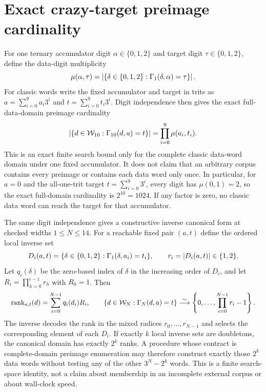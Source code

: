 \documentclass{article}
\newcommand{\fitmath}[1]{\resizebox{0.99\linewidth}{!}{$\displaystyle #1$}}
\begin{document}
\section{Exact crazy-target preimage cardinality}

For one ternary accumulator digit $\alpha\in\{0,1,2\}$ and target digit
$\tau\in\{0,1,2\}$, define the data-digit multiplicity
\[
  \mu(\alpha,\tau)
    = \left|\{\delta\in\{0,1,2\}:\Gamma_{1}\!\left(\delta,\alpha\right)=\tau\}\right|.
\]
For classic words write the fixed accumulator and target in trits as
$a=\sum_{i=0}^{9}a_i3^i$ and $t=\sum_{i=0}^{9}t_i3^i$. Digit independence
then gives the exact full-data-domain preimage cardinality
\begin{equation}
  \left|\{d\in\mathcal{W}_{10}:\Gamma_{10}\!\left(d,a\right)=t\}\right|
    = \prod_{i=0}^{9}\mu(a_i,t_i).
  \label{eq:optimization-crazy-preimage-cardinality}
\end{equation}
This is an exact finite search bound only for the complete classic data-word
domain under one fixed accumulator. It does not claim that an arbitrary corpus
contains every preimage or contains each data word only once. In particular,
for $a=0$ and the all-one-trit target $t=\sum_{i=0}^{9}3^i$, every digit has
$\mu(0,1)=2$, so the exact full-domain cardinality is $2^{10}=1024$. If any
factor is zero, no classic data word can reach the target for that accumulator.

The same digit independence gives a constructive inverse canonical form at
checked widths $1\leq N\leq14$. For a reachable fixed pair $(a,t)$ define the
ordered local inverse set
\[
  D_i(a,t)=\{\delta\in\{0,1,2\}:\Gamma_{1}\!\left(\delta,a_i\right)=t_i\},
  \qquad r_i=|D_i(a,t)|\in\{1,2\}.
\]
Let $q_i(\delta)$ be the zero-based index of $\delta$ in the increasing order
of $D_i$, and let $R_i=\prod_{h=0}^{i-1}r_h$ with $R_0=1$. Then
\begin{equation}
  \fitmath{%
    \operatorname{rank}_{a,t}(d)
      =\sum_{i=0}^{N-1}q_i(d_i)R_i,
    \qquad
    \{d\in\WordDomain{N}:\CrazyN{N}{d}{a}=t\}
      \overset{\sim}{\longrightarrow}
    \left\{0,\ldots,\prod_{i=0}^{N-1}r_i-1\right\}.
  }
  \label{eq:optimization-crazy-profile-preimage-ranking}
\end{equation}
The inverse decodes the rank in the mixed radices $r_0,\ldots,r_{N-1}$ and
selects the corresponding element of each $D_i$. If exactly $k$ local inverse
sets are doubletons, the canonical domain has exactly $2^k$ ranks. A procedure
whose contract is complete-domain preimage enumeration may therefore construct
exactly those $2^k$ data words without testing any of the other $3^N-2^k$
words. This is a finite search-space identity, not a claim about membership in
an incomplete external corpus or about wall-clock speed.
\end{document}
